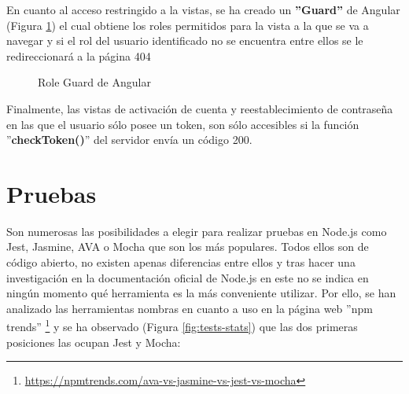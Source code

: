 En cuanto al acceso restringido a la vistas, se ha creado un \textbf{''Guard''} de Angular (Figura \ref{fig:guard}) el cual obtiene los roles permitidos para la vista a la que se va a navegar y si el rol del usuario identificado no se encuentra entre ellos se le redireccionará a la página 404

\begin{figure}[H]
    \caption{Role Guard de Angular}
    \label{fig:guard}
\end{figure}

Finalmente, las vistas de activación de cuenta y reestablecimiento de contraseña en las que el usuario sólo posee un token, son sólo accesibles si la función ''\textbf{checkToken()}'' del servidor envía un código 200.

\section{Pruebas}
Son numerosas las posibilidades a elegir para realizar pruebas en Node.js como Jest, Jasmine, AVA o Mocha que son los más populares. Todos ellos son de código abierto, no existen apenas diferencias entre ellos y tras hacer una investigación en la documentación oficial de Node.js en este no se indica en ningún momento qué herramienta es la más conveniente utilizar. Por ello, se han analizado las herramientas nombras en cuanto a uso en la página web ''npm trends'' \footnote{\url{https://npmtrends.com/ava-vs-jasmine-vs-jest-vs-mocha}} y se ha observado (Figura \ref{fig:tests-stats}) que las dos primeras posiciones las ocupan Jest y Mocha:

